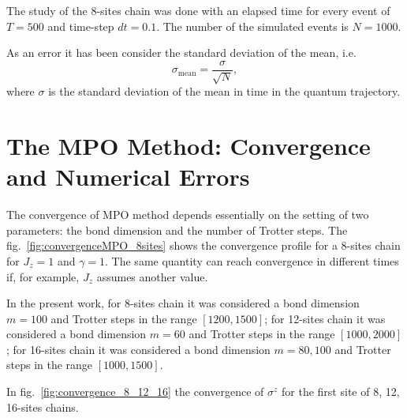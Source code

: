 The study of the 8-sites chain was done with an elapsed time for every event of $T = 500$ and time-step $dt = 0.1$. The number of the simulated events is $N = 1000$.

As an error it has been consider the standard deviation of the mean, i.e.
\begin{equation*}
    \sigma_{\text{mean}} = \frac{\sigma}{\sqrt{N}},
\end{equation*}
where $\sigma$ is the standard deviation of the mean in time in the quantum trajectory.

\section{The MPO Method: Convergence and Numerical Errors}
The convergence of MPO method depends essentially on the setting of two parameters: the bond dimension and the number of Trotter steps. The fig.~\ref{fig:convergenceMPO_8sites} shows the convergence profile for a 8-sites chain for $J_z = 1$ and $\gamma = 1$. The same quantity can reach convergence in different times if, for example, $J_z$ assumes another value. 

In the present work, for 8-sites chain it was considered a bond dimension $m = 100$ and Trotter steps in the range $[1200, 1500]$; for 12-sites chain it was considered a bond dimension $m = 60$ and Trotter steps in the range $[1000, 2000]$; for 16-sites chain it was considered a bond dimension $m = 80, 100$ and Trotter steps in the range $[1000, 1500]$.

In fig.~\ref{fig:convergence_8_12_16} the convergence of $\sigma^z$ for the first site of 8, 12, 16-sites chains. 


